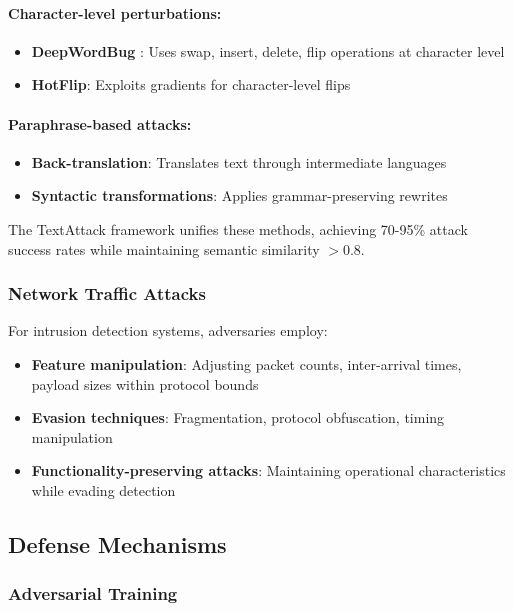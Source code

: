 \documentclass[12pt,a4paper]{article}
\theoremstyle{definition}
\begin{document}
\paragraph{Character-level perturbations:}
\begin{itemize}
\item \textbf{DeepWordBug} \citep{gao2018black}: Uses swap, insert, delete, flip operations at character level
\item \textbf{HotFlip}: Exploits gradients for character-level flips
\end{itemize}

\paragraph{Paraphrase-based attacks:}
\begin{itemize}
\item \textbf{Back-translation}: Translates text through intermediate languages
\item \textbf{Syntactic transformations}: Applies grammar-preserving rewrites
\end{itemize}

The TextAttack framework \citep{morris2020textattack} unifies these methods, achieving 70-95\% attack success rates while maintaining semantic similarity $>0.8$.

\subsubsection{Network Traffic Attacks}

For intrusion detection systems, adversaries employ:
\begin{itemize}
\item \textbf{Feature manipulation}: Adjusting packet counts, inter-arrival times, payload sizes within protocol bounds
\item \textbf{Evasion techniques}: Fragmentation, protocol obfuscation, timing manipulation
\item \textbf{Functionality-preserving attacks}: Maintaining operational characteristics while evading detection \citep{mccarthy2022functionality}
\end{itemize}

\subsection{Defense Mechanisms}

\subsubsection{Adversarial Training}
\end{document}

